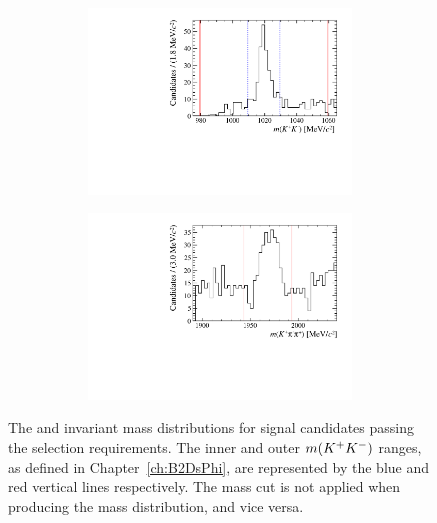\begin{figure}[!h]
\begin{subfigure}[t]{1.0\textwidth}
\begin{subfigure}[t]{0.35\textwidth}
        \centering
        \includegraphics[width=1.0\textwidth]{figs/Selection/Phimass_KPiPi_B2DsPhi.pdf}
     \end{subfigure}
     \begin{subfigure}[t]{0.35\textwidth}
        \centering
        \includegraphics[width=1.0\textwidth]{figs/Selection/Dmass_KPiPi_B2DsPhi.pdf}
     \end{subfigure}
     \caption{\decay{\Bp}{(\decay{\Dsp}{\Kp\pim\pip})\phiz}}
   \end{subfigure}
   \caption{The \Dsp and \phiz invariant mass distributions for signal \decay{\Bp}{\Dsp\phiz} candidates passing the selection requirements. The inner and outer $m({{K}^+}{{K}^-})$ ranges, as defined in Chapter~\ref{ch:B2DsPhi}, are represented by the blue and red vertical lines respectively. The \Dsp mass cut is not applied when producing the \phiz mass distribution, and vice versa.}
   \label{fig:d_phi_mass_signal}   
\end{figure}
